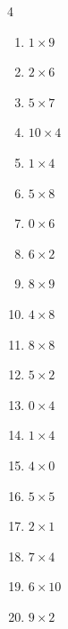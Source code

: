 \begin{multicols}{4}
\begin{enumerate}
  \item $1\times 9$
        \phantom{$=9$}

  \item $2\times 6$
        \phantom{$=12$}

  \item $5\times 7$
        \phantom{$=35$}

  \item $10\times 4$
        \phantom{$=40$}

  \item $1\times 4$
        \phantom{$=4$}

  \item $5\times 8$
        \phantom{$=40$}

  \item $0\times 6$
        \phantom{$=0$}

  \item $6\times 2$
        \phantom{$=12$}

  \item $8\times 9$
        \phantom{$=72$}

\columnbreak %

\resetques

  \item $4\times 8$
        \phantom{$=32$}

  \item $8\times 8$
        \phantom{$=64$}

  \item $5\times 2$
        \phantom{$=10$}

  \item $0\times 4$
        \phantom{$=0$}

  \item $1\times 4$
        \phantom{$=4$}

  \item $4\times 0$
        \phantom{$=0$}

  \item $5\times 5$
        \phantom{$=25$}

  \item $2\times 1$
        \phantom{$=2$}

  \item $7\times 4$
        \phantom{$=28$}

  \item $6\times 10$
        \phantom{$=60$}

  \item $9\times 2$
        \phantom{$=18$}


\end{enumerate}
\end{multicols}
